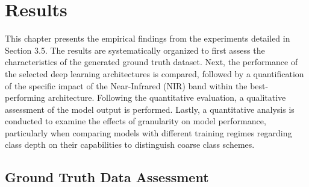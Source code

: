 \documentclass{report}
\begin{document}
\clearpage %
\section{Results}
\label{sec:results}
This chapter presents the empirical findings from the experiments detailed in Section 3.5. The results are systematically organized to first assess the characteristics of the generated ground truth dataset. Next, the performance of the selected deep learning architectures is compared, followed by a quantification of the specific impact of the Near-Infrared (NIR) band within the best-performing architecture. Following the quantitative evaluation, a qualitative assessment of the model output is performed. Lastly, a quantitative analysis is conducted to examine the effects of granularity on model performance, particularly when comparing models with different training regimes regarding class depth on their capabilities to distinguish coarse class schemes.
\subsection{Ground Truth Data Assessment}
\end{document}
